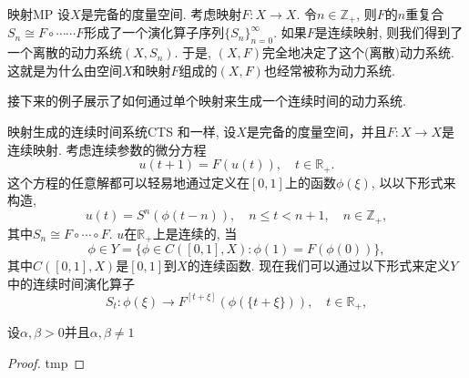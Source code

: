 \begin{example}{映射}{MP}
	设$X$是完备的度量空间. 考虑映射$F:X\to X$. 令$n\in\mathbb{Z}_{+}$, 则$F$的$n$重复合$S_{n}\cong F\circ\cdots\cdots F$形成了一个演化算子序列$\{S_{n}\}_{n=0}^{\infty}$. 如果$F$是连续映射, 则我们得到了一个离散的动力系统$(X,S_{n})$. 于是, $(X,F)$完全地决定了这个(离散)动力系统. 这就是为什么由空间$X$和映射$F$组成的$(X,F)$也经常被称为动力系统. 
\end{example}

接下来的例子展示了如何通过单个映射来生成一个连续时间的动力系统. 

\begin{example}{映射生成的连续时间系统}{CTS}
	和一样, 设$X$是完备的度量空间，并且$F:X\to X$是连续映射. 考虑连续参数的微分方程$$u(t+1)=F(u(t)),\quad t\in\mathbb{R}_{+}.$$这个方程的任意解都可以轻易地通过定义在$[0,1]$上的函数$\phi(\xi)$, 以以下形式来构造, $$u(t)=S^{n}(\phi(t-n)),\quad n\leqslant t<n+1,\quad n\in\mathbb{Z}_{+},$$其中$S_{n}\cong F\circ\cdots\circ F$. $u$在$\mathbb{R}_{+}$上是连续的, 当$$\phi\in Y=\{\phi\in C([0,1],X):\phi(1)=F(\phi(0))\},$$其中$C([0,1],X)$是$[0,1]$到$X$的连续函数. 现在我们可以通过以下形式来定义$Y$中的连续时间演化算子$$S_{t}:\phi(\xi)\to F^{[t+\xi]}(\phi(\{t+\xi\})),\quad t\in\mathbb{R}_{+},$$
\end{example}

\begin{exercise}
设$\alpha,\beta>0$并且$\alpha,\beta\neq 1$

\end{exercise}

\begin{proof}
	tmp
\end{proof}

